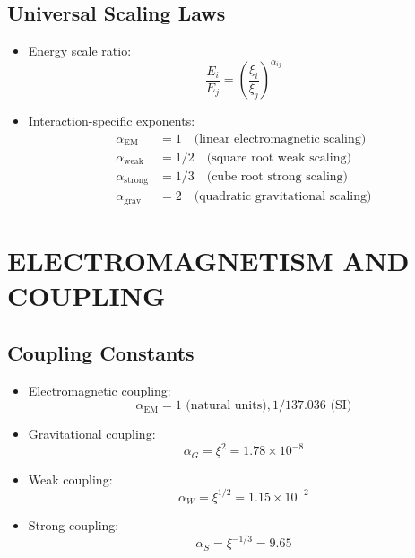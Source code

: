 \documentclass[12pt,a4paper]{article}
\begin{document}
	\subsection{Universal Scaling Laws}
	\begin{itemize}
		\item Energy scale ratio:
		$$\frac{E_i}{E_j} = \left(\frac{\xi_i}{\xi_j}\right)^{\alpha_{ij}}$$
		
		\item Interaction-specific exponents:
		\begin{align*}
			\alpha_{\text{EM}} &= 1 \quad \text{(linear electromagnetic scaling)}\\
			\alpha_{\text{weak}} &= 1/2 \quad \text{(square root weak scaling)}\\
			\alpha_{\text{strong}} &= 1/3 \quad \text{(cube root strong scaling)}\\
			\alpha_{\text{grav}} &= 2 \quad \text{(quadratic gravitational scaling)}
		\end{align*}
	\end{itemize}
	
	\section{ELECTROMAGNETISM AND COUPLING}
	
	\subsection{Coupling Constants}
	\begin{itemize}
		\item Electromagnetic coupling:
		$$\alpha_{\text{EM}} = 1 \text{ (natural units)}, 1/137.036 \text{ (SI)}$$
		
		\item Gravitational coupling:
		$$\alpha_G = \xi^2 = 1.78 \times 10^{-8}$$
		
		\item Weak coupling:
		$$\alpha_W = \xi^{1/2} = 1.15 \times 10^{-2}$$
		
		\item Strong coupling:
		$$\alpha_S = \xi^{-1/3} = 9.65$$
	\end{itemize}
	
\end{document}
